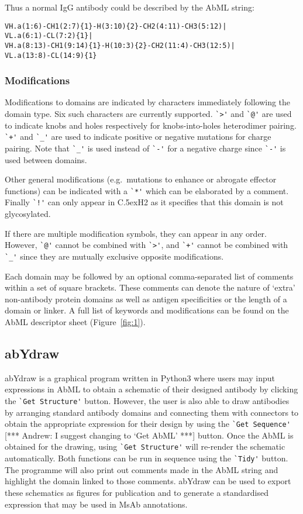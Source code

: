 \documentclass[a4]{article}
\newcommand{\CH}[1]{\mbox{C\lower.5ex\hbox{\scriptsize H}#1}}
\newcommand{\andrew}[1]{{\color{red} [*** Andrew: #1 ***]}}
\begin{document}
Thus a normal IgG antibody could be described by the AbML string:
\begin{verbatim}
VH.a(1:6)-CH1(2:7){1}-H(3:10){2}-CH2(4:11)-CH3(5:12)|
VL.a(6:1)-CL(7:2){1}|
VH.a(8:13)-CH1(9:14){1}-H(10:3){2}-CH2(11:4)-CH3(12:5)|
VL.a(13:8)-CL(14:9){1}
\end{verbatim}

\subsubsection{Modifications}
Modifications to domains are indicated by characters immediately following the
domain type. Six such characters are currently supported.
\verb|`>'| and \verb|`@'| are used to indicate
knobs and holes respectively for knobs-into-holes heterodimer pairing.
\verb|`+'| and \verb|`_'| are used to indicate
positive or negative mutations for charge pairing. Note that
\verb|`_'| is used instead of \verb|`-'| for a negative charge since
\verb|`-'| is used between domains.

Other general modifications (e.g.\ mutations to enhance or abrogate
effector functions) can be indicated with a \verb|`*'| which can be
elaborated by a comment. Finally \verb|`!'| can only appear in \CH{2}
as it specifies that this domain is not glycosylated.

If there are multiple modification symbols, they can appear in any
order.  However, \verb|`@'| cannot be combined with \verb|`>'|, and
\verb|`+'| cannot be combined with \verb|`_'| since they are mutually
exclusive opposite modifications.

Each domain may be followed by an optional comma-separated list of comments
within a set of square brackets. These comments can denote the nature of
`extra' non-antibody protein domains as well as antigen
specificities or the length of a domain or linker. A full list of
keywords and modifications can be found on the AbML descriptor sheet
(Figure~\ref{fig:1}).

\subsection{abYdraw}
abYdraw is a graphical program written in Python3 where users may
input expressions in AbML to obtain a schematic of their designed
antibody by clicking the \verb|`Get Structure'| button. However, the user is
also able to draw antibodies by arranging standard antibody domains
and connecting them with connectors to obtain the appropriate expression
for their design by using the \verb|`Get Sequence'|
\andrew{I suggest changing to `Get AbML'} button. Once the AbML
is obtained for the drawing, using \verb|`Get Structure'| will re-render the
schematic automatically. Both functions can be run in sequence using the
\verb|`Tidy'| button. The programme will also print out comments made in the
AbML string and highlight the domain linked to those comments. abYdraw
can be used to export these schematics as figures for
publication and to generate a standardised expression that may be used
in MsAb annotations.  
\end{document}
